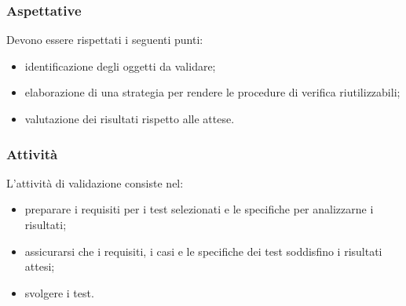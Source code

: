 \subsubsection{Aspettative}
Devono essere rispettati i seguenti punti:
\begin{itemize}
	\item identificazione degli oggetti da validare;
	\item elaborazione di una strategia per rendere le procedure di verifica riutilizzabili;
	\item valutazione dei risultati rispetto alle attese.
\end{itemize}

\subsubsection{Attività}
L'attività di validazione consiste nel:
\begin{itemize}
	\item preparare i requisiti per i test selezionati e le specifiche per analizzarne i risultati;
	\item assicurarsi che i requisiti, i casi e le specifiche dei test soddisfino i risultati attesi;
	\item svolgere i test.
\end{itemize}

